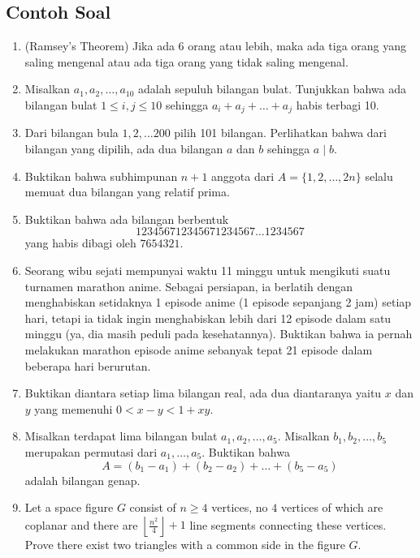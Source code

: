 \documentclass[11pt]{scrartcl}
\begin{document}
\subsection{Contoh Soal}
\begin{enumerate}
    \item (Ramsey's Theorem) Jika ada 6 orang atau lebih, maka ada tiga orang yang saling mengenal atau ada tiga orang yang tidak saling mengenal.

    \item Misalkan $a_1, a_2, \dots, a_{10}$ adalah sepuluh bilangan bulat. Tunjukkan bahwa ada bilangan bulat $1 \le i,j \le 10$ sehingga $a_i+a_j+\dots+a_j$ habis terbagi 10.

    \item Dari bilangan bula $1,2,\dots 200$ pilih 101 bilangan. Perlihatkan bahwa dari bilangan yang dipilih, ada dua bilangan $a$ dan $b$ sehingga $a \mid b$.

    \item Buktikan bahwa subhimpunan $n+1$ anggota dari $A=\{1,2,\dots, 2n\}$ selalu memuat dua bilangan yang relatif prima.

    \item Buktikan bahwa ada bilangan berbentuk $$123456712345671234567\dots1234567$$
    yang habis dibagi oleh $7654321$.

    \item Seorang wibu sejati mempunyai waktu 11 minggu untuk mengikuti suatu turnamen marathon anime. Sebagai persiapan, ia berlatih dengan menghabiskan setidaknya 1 episode anime (1 episode sepanjang 2 jam) setiap hari, tetapi ia tidak ingin menghabiskan lebih dari 12 episode dalam satu minggu (ya, dia masih peduli pada kesehatannya). Buktikan bahwa ia pernah melakukan marathon episode anime sebanyak tepat 21 episode dalam beberapa hari berurutan.

    \item Buktikan diantara setiap lima bilangan real, ada dua diantaranya yaitu $x$ dan $y$ yang memenuhi $0 < x-y < 1+xy$.

    \item Misalkan terdapat lima bilangan bulat $a_1, a_2, \dots, a_5$. Misalkan $b_1,b_2,\dots,b_5$ merupakan permutasi dari $a_1,\dots,a_5$. Buktikan bahwa 
    $$A=(b_1-a_1)+(b_2-a_2)+\dots+(b_5-a_5)$$ adalah bilangan genap.

    \item Let a space figure $G$ consist of $n \ge 4$ vertices, no $4$ vertices of which are coplanar and there are $\left\lfloor \frac{n^2}{4} \right\rfloor + 1$ line segments connecting these vertices. Prove there exist two triangles with a common side in the figure $G$.
    

\end{enumerate}
\end{document}
